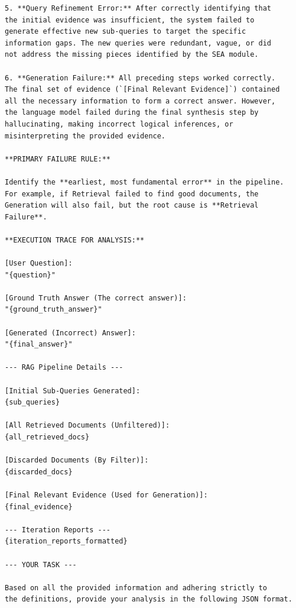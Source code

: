 \documentclass[11pt]{article}
\begin{document}
\begin{lstlisting}[basicstyle=\tiny\ttfamily]
5. **Query Refinement Error:** After correctly identifying that 
the initial evidence was insufficient, the system failed to 
generate effective new sub-queries to target the specific 
information gaps. The new queries were redundant, vague, or did 
not address the missing pieces identified by the SEA module.

6. **Generation Failure:** All preceding steps worked correctly. 
The final set of evidence (`[Final Relevant Evidence]`) contained 
all the necessary information to form a correct answer. However, 
the language model failed during the final synthesis step by 
hallucinating, making incorrect logical inferences, or 
misinterpreting the provided evidence.

**PRIMARY FAILURE RULE:**

Identify the **earliest, most fundamental error** in the pipeline. 
For example, if Retrieval failed to find good documents, the 
Generation will also fail, but the root cause is **Retrieval 
Failure**.

**EXECUTION TRACE FOR ANALYSIS:**

[User Question]:
"{question}"

[Ground Truth Answer (The correct answer)]:
"{ground_truth_answer}"

[Generated (Incorrect) Answer]:
"{final_answer}"

--- RAG Pipeline Details ---

[Initial Sub-Queries Generated]:
{sub_queries}

[All Retrieved Documents (Unfiltered)]:
{all_retrieved_docs}

[Discarded Documents (By Filter)]:
{discarded_docs}

[Final Relevant Evidence (Used for Generation)]:
{final_evidence}

--- Iteration Reports ---
{iteration_reports_formatted}

--- YOUR TASK ---

Based on all the provided information and adhering strictly to 
the definitions, provide your analysis in the following JSON format.


\end{lstlisting}
\end{document}
